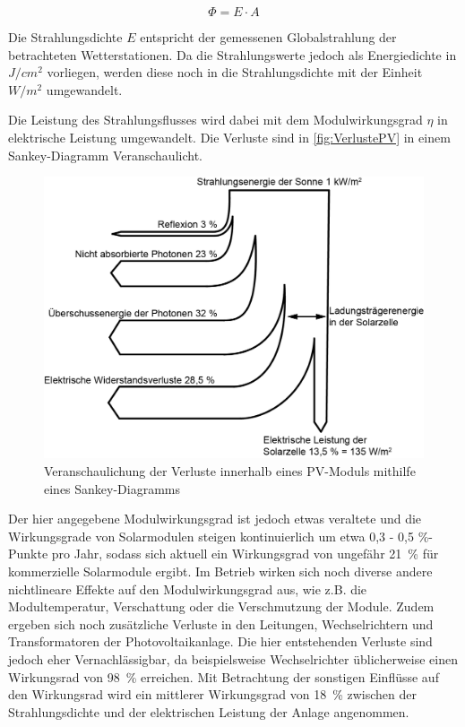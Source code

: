 \begin{equation}
	\Phi = E \cdot A
\end{equation}

Die Strahlungsdichte $E$ entspricht der gemessenen Globalstrahlung der betrachteten Wetterstationen. Da die Strahlungswerte jedoch als Energiedichte in $J/cm^2$ vorliegen, werden diese noch in die Strahlungsdichte mit der Einheit $W/m^2$ umgewandelt.

Die Leistung des Strahlungsflusses wird dabei mit dem Modulwirkungsgrad $\eta$ in elektrische Leistung umgewandelt. Die Verluste sind in \autoref{fig:VerlustePV} in einem Sankey-Diagramm Veranschaulicht. 

\begin{figure}[H]
	\centering
	\includegraphics[width=0.7\linewidth]{Abbildungen/WirkungsgradPV.png}
	\caption{Veranschaulichung der Verluste innerhalb eines PV-Moduls mithilfe eines Sankey-Diagramms \cite{VerlustePV}}
	\label{fig:VerlustePV}
\end{figure}

Der hier angegebene Modulwirkungsgrad ist jedoch etwas veraltete und die Wirkungsgrade von Solarmodulen steigen kontinuierlich um etwa 0,3 - 0,5 \%-Punkte pro Jahr, sodass sich aktuell ein Wirkungsgrad von ungefähr 21~\% für kommerzielle Solarmodule ergibt. Im Betrieb wirken sich noch diverse andere nichtlineare Effekte auf den Modulwirkungsgrad aus, wie z.B. die Modultemperatur, Verschattung oder die Verschmutzung der Module. Zudem ergeben sich noch zusätzliche Verluste in den Leitungen, Wechselrichtern und Transformatoren der Photovoltaikanlage. Die hier entstehenden Verluste sind jedoch eher Vernachlässigbar, da beispielsweise Wechselrichter üblicherweise einen Wirkungsrad von 98~\% erreichen. Mit Betrachtung der sonstigen Einflüsse auf den Wirkungsrad wird ein mittlerer Wirkungsgrad von 18~\% zwischen der Strahlungsdichte und der elektrischen Leistung der Anlage angenommen. \cite{FaktenPV} 

